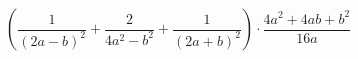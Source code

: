 \begin{ex}[type=expression]
	\begin{condition}
		 \( \left( \dfrac{1}{(2a-b)^2}+\dfrac{2}{4a^2-b^2}+\dfrac{1}{(2a+b)^2} \right)\cdot\dfrac{4a^2+4ab+b^2}{16a} \)
	\end{condition}
\end{ex}